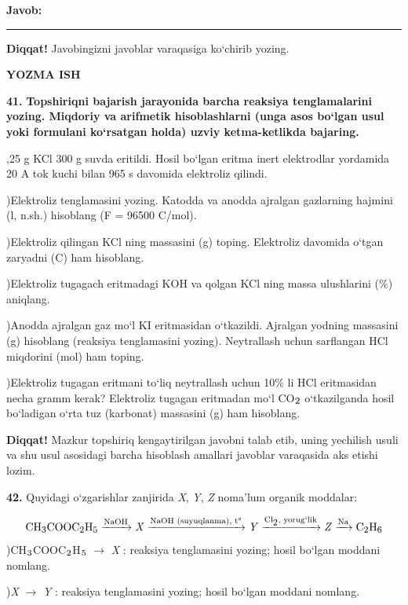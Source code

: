 \documentclass[11pt,a4paper]{article}
\renewcommand{\textsubscript}[1]{\ensuremath{_{\text{\fontsize{8}{8}\selectfont #1}}}}
\newcommand{\diqqat}[1]{\par\smallskip\noindent\textbf{Diqqat!} #1\par\medskip}
\newcommand{\javob}{\par\smallskip\noindent\textbf{Javob:} \rule[-2pt]{7.5cm}{0.4pt}\par\smallskip\noindent\textbf{Diqqat!} Javobingizni javoblar varaqasiga ko`chirib yozing.\par\medskip}
\begin{document}
\javob
\par\bigskip\begin{center}\textbf{\fontsize{13}{15}\selectfont YOZMA ISH}\end{center}
\noindent\textbf{41.} \textbf{Topshiriqni bajarish jarayonida barcha reaksiya tenglamalarini yozing. Miqdoriy va arifmetik hisoblashlarni (unga asos bo`lgan usul yoki formulani ko`rsatgan holda) uzviy ketma-ketlikda bajaring.}\par{},25 g KCl 300 g suvda eritildi. Hosil bo`lgan eritma inert elektrodlar yordamida 20 A tok kuchi bilan 965 s davomida elektroliz qilindi.\par
{})Elektroliz tenglamasini yozing. Katodda va anodda ajralgan gazlarning hajmini (l, n.sh.) hisoblang (F = 96500 C/mol).\par
{})Elektroliz qilingan KCl ning massasini (g) toping. Elektroliz davomida o`tgan zaryadni (C) ham hisoblang.\par
{})Elektroliz tugagach eritmadagi KOH va qolgan KCl ning massa ulushlarini (\%) aniqlang.\par
{})Anodda ajralgan gaz mo`l KI eritmasidan o`tkazildi. Ajralgan yodning massasini (g) hisoblang (reaksiya tenglamasini yozing). Neytrallash uchun sarflangan HCl miqdorini (mol) ham toping.\par
{})Elektroliz tugagan eritmani to`liq neytrallash uchun 10\% li HCl eritmasidan necha gramm kerak? Elektroliz tugagan eritmadan mo`l CO\textsubscript{2} o`tkazilganda hosil bo`ladigan o`rta tuz (karbonat) massasini (g) ham hisoblang.\par
\diqqat{Mazkur topshiriq kengaytirilgan javobni talab etib, uning yechilish usuli va shu usul asosidagi barcha hisoblash amallari javoblar varaqasida aks etishi lozim.}
\noindent\textbf{42.} Quyidagi o`zgarishlar zanjirida \textit{X}, \textit{Y}, \textit{Z} noma'lum organik moddalar:\par
\[\setlength{\fboxsep}{0pt}\text{CH\textsubscript{3}COOC\textsubscript{2}H\textsubscript{5}}\xrightarrow{\text{NaOH}}\text{\textit{X}}\xrightarrow{\text{NaOH (suyuqlanma), t\textdegree{}}}\text{\textit{Y}}\xrightarrow{\text{Cl\textsubscript{2}, yorug`lik}}\text{\textit{Z}}\xrightarrow{\text{Na}}\text{C\textsubscript{2}H\textsubscript{6}}\]
)CH\textsubscript{3}COOC\textsubscript{2}H\textsubscript{5} $\to$ \textit{X} : reaksiya tenglamasini yozing; hosil bo`lgan moddani nomlang.\par
{})\textit{X} $\to$ \textit{Y} : reaksiya tenglamasini yozing; hosil bo`lgan moddani nomlang.\par
\end{document}
